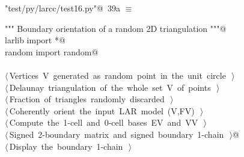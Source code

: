 \documentclass[11pt,oneside]{article}	%
\begin{document}
\begin{flushleft} \small \label{scrap60}
\protect{}\verb@"test/py/larcc/test16.py"@\nobreak\ {\footnotesize 39a }$\equiv$
\vspace{-1ex}
\begin{list}{}{} \item
\mbox{}\verb@""" Boundary orientation of a random 2D triangulation """@\\
\mbox{}\verb@from larlib import *@\\
\mbox{}\verb@from random import random@\\
\mbox{}\verb@@\\
\mbox{}\verb@@\hbox{$\langle\,$Vertices V generated as random point in the unit circle\nobreak\ {\footnotesize {}}$\,\rangle$}\verb@@\\
\mbox{}\verb@@\hbox{$\langle\,$Delaunay triangulation of the whole set V of points\nobreak\ {\footnotesize {}}$\,\rangle$}\verb@@\\
\mbox{}\verb@@\hbox{$\langle\,$Fraction of triangles randomly discarded\nobreak\ {\footnotesize {}}$\,\rangle$}\verb@@\\
\mbox{}\verb@@\hbox{$\langle\,$Coherently orient the input LAR model (V,FV)\nobreak\ {\footnotesize {}}$\,\rangle$}\verb@@\\
\mbox{}\verb@@\hbox{$\langle\,$Compute the 1-cell and 0-cell bases EV and VV\nobreak\ {\footnotesize {}}$\,\rangle$}\verb@@\\
\mbox{}\verb@@\hbox{$\langle\,$Signed 2-boundary matrix and signed boundary 1-chain\nobreak\ {\footnotesize {}}$\,\rangle$}\verb@   @\\
\mbox{}\verb@@\hbox{$\langle\,$Display the boundary 1-chain\nobreak\ {\footnotesize {}}$\,\rangle$}\verb@@\\
\mbox{}\verb@@{\NWsep}
\end{list}
\vspace{-2ex}
\end{flushleft}
\end{document}
